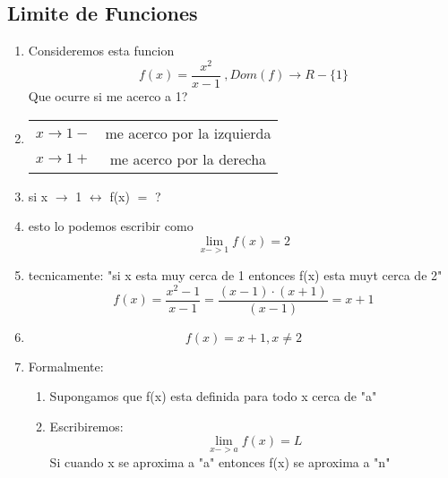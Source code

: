 \documentclass{article}
\begin{document}
        \subsection{Limite de Funciones}
            \begin{enumerate}
                \item Consideremos esta funcion 
                \begin{equation}
                    f(x) = \frac{x^2}{x-1} \ , Dom(f) \rightarrow R -\{1\}
                \end{equation} Que ocurre si me acerco a 1?
                \item \begin{tabular} {c c}
                    $x\rightarrow 1- $& me acerco por la izquierda \\
                    $x\rightarrow 1+$ & me acerco por la derecha
                \end{tabular}
                \item si x $\rightarrow$ 1 $\longleftrightarrow$ f(x) $=$ ?
                \item esto lo podemos escribir como
                \begin{equation}
                    \lim_{x->1} f(x)=2
                \end{equation}
                \item tecnicamente: "si x esta muy cerca de 1 entonces f(x) esta muyt cerca de 2"
                \begin{equation}
                    f(x) = \frac{x^2-1}{x-1}= \frac{(x-1)\cdot (x+1)}{(x-1)} = x+1 
                \end{equation}
                \item 
                \begin{equation}
                    f(x) = x+1, x\neq 2
                \end{equation}
                \item Formalmente:
                \begin{enumerate}
                    \item Supongamos que f(x) esta definida para todo x cerca de "a" 
                    \item Escribiremos: \begin{equation}
                        \lim_{x->a} f(x) = L
                    \end{equation} Si cuando x se aproxima a "a" entonces f(x) se aproxima a "n"
                \end{enumerate}

\end{enumerate}
\end{document}
